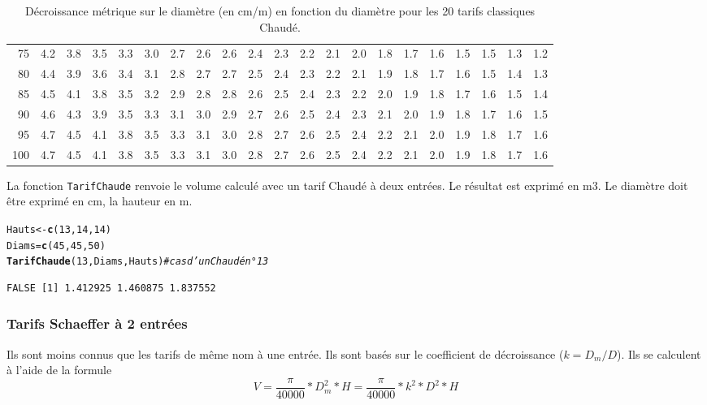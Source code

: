 \documentclass{article}\usepackage[]{graphicx}\usepackage[]{color}
\makeatletter
\newcommand{\hlnum}[1]{\textcolor[rgb]{0.686,0.059,0.569}{#1}}%
\newcommand{\hlcom}[1]{\textcolor[rgb]{0.678,0.584,0.686}{\textit{#1}}}%
\newcommand{\hlstd}[1]{\textcolor[rgb]{0.345,0.345,0.345}{#1}}%
\newcommand{\hlkwb}[1]{\textcolor[rgb]{0.69,0.353,0.396}{#1}}%
\newcommand{\hlkwd}[1]{\textcolor[rgb]{0.737,0.353,0.396}{\textbf{#1}}}%
\newenvironment{kframe}{%
 \def\at@end@of@kframe{}%
 \ifinner\ifhmode%
  \def\at@end@of@kframe{\end{minipage}}%
  \begin{minipage}{\columnwidth}%
 \fi\fi%
 \def\FrameCommand##1{\hskip\@totalleftmargin \hskip-\fboxsep
 \colorbox{shadecolor}{##1}\hskip-\fboxsep
     \hskip-\linewidth \hskip-\@totalleftmargin \hskip\columnwidth}%
 \MakeFramed {\advance\hsize-\width
   \@totalleftmargin\z@ \linewidth\hsize
   \@setminipage}}%
 {\par\unskip\endMakeFramed%
 \at@end@of@kframe}
\newenvironment{knitrout}{}{} %
\makeatother
\begin{document}
\begin{table}[ht]
\begin{tabular}{rrrrrrrrrrrrrrrrrrrrr}
  75 & 4.2 & 3.8 & 3.5 & 3.3 & 3.0 & 2.7 & 2.6 & 2.6 & 2.4 & 2.3 & 2.2 & 2.1 & 2.0 & 1.8 & 1.7 & 1.6 & 1.5 & 1.5 & 1.3 & 1.2 \\ 
  80 & 4.4 & 3.9 & 3.6 & 3.4 & 3.1 & 2.8 & 2.7 & 2.7 & 2.5 & 2.4 & 2.3 & 2.2 & 2.1 & 1.9 & 1.8 & 1.7 & 1.6 & 1.5 & 1.4 & 1.3 \\ 
  85 & 4.5 & 4.1 & 3.8 & 3.5 & 3.2 & 2.9 & 2.8 & 2.8 & 2.6 & 2.5 & 2.4 & 2.3 & 2.2 & 2.0 & 1.9 & 1.8 & 1.7 & 1.6 & 1.5 & 1.4 \\ 
  90 & 4.6 & 4.3 & 3.9 & 3.5 & 3.3 & 3.1 & 3.0 & 2.9 & 2.7 & 2.6 & 2.5 & 2.4 & 2.3 & 2.1 & 2.0 & 1.9 & 1.8 & 1.7 & 1.6 & 1.5 \\ 
  95 & 4.7 & 4.5 & 4.1 & 3.8 & 3.5 & 3.3 & 3.1 & 3.0 & 2.8 & 2.7 & 2.6 & 2.5 & 2.4 & 2.2 & 2.1 & 2.0 & 1.9 & 1.8 & 1.7 & 1.6 \\ 
  100 & 4.7 & 4.5 & 4.1 & 3.8 & 3.5 & 3.3 & 3.1 & 3.0 & 2.8 & 2.7 & 2.6 & 2.5 & 2.4 & 2.2 & 2.1 & 2.0 & 1.9 & 1.8 & 1.7 & 1.6 \\ 
   \hline
\end{tabular}
\endgroup
\caption{Décroissance métrique sur le diamètre (en cm/m) en fonction du diamètre pour les 20 tarifs classiques Chaudé.} 
\label{decChaude}
\end{table}


La fonction \texttt{TarifChaude} renvoie le volume calculé avec un tarif Chaudé à deux entrées. Le résultat est exprimé en m3. Le diamètre doit être exprimé en cm, la hauteur en m.
\begin{knitrout}\small
{}\color{fgcolor}\begin{kframe}
\begin{alltt}
\hlstd{Hauts} \hlkwb{<-} \hlkwd{c}\hlstd{(}\hlnum{13}\hlstd{,}\hlnum{14}\hlstd{,}\hlnum{14}\hlstd{)}
\hlstd{Diams} \hlkwb{=} \hlkwd{c}\hlstd{(}\hlnum{45}\hlstd{,}\hlnum{45}\hlstd{,}\hlnum{50}\hlstd{)}
\hlkwd{TarifChaude}\hlstd{(}\hlnum{13}\hlstd{, Diams, Hauts)} \hlcom{# cas d'un Chaudé n°13}
\end{alltt}
\begin{verbatim}
FALSE [1] 1.412925 1.460875 1.837552
\end{verbatim}
\end{kframe}
\end{knitrout}


\subsubsection{Tarifs Schaeffer à 2 entrées}
Ils sont moins connus que les tarifs de même nom à une entrée. Ils sont basés sur le coefficient de décroissance ($ k = D_m/D $). Ils se calculent à l'aide de la formule
\begin{displaymath}
V = \frac{\pi}{40000} * D^2_m * H = \frac{\pi}{40000} * k^2 * D^2 * H
\end{displaymath}
\end{document}
